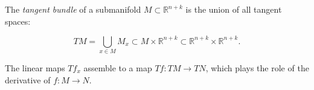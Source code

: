 The \textit{tangent bundle} of a submanifold $M \subset \mathbb{R}^{n+k}$ is the union of all tangent spaces:

$$TM = \bigcup_{x \in M} M_x \subset M \times \mathbb{R}^{n+k} \subset \mathbb{R}^{n+k} \times \mathbb{R}^{n+k}.$$

The linear maps $Tf_x$ assemble to a map $Tf: TM \to TN$, which plays the role of the derivative of $f: M \to N$.
